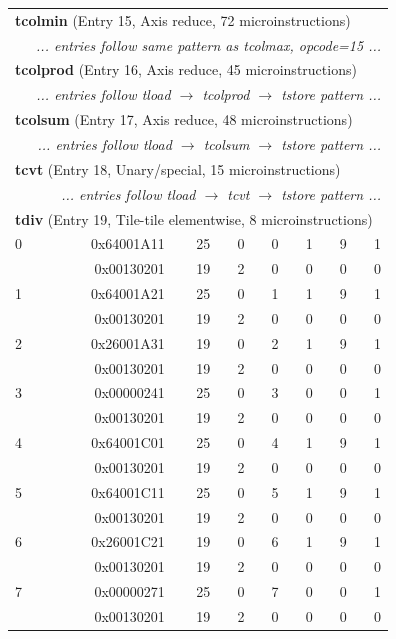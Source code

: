 \begin{longtable}{r r r r r r r r}
\multicolumn{8}{l}{\textbf{tcolmin} (Entry 15, Axis reduce, 72 microinstructions)} \\
  & \multicolumn{7}{r}{\textit{... entries follow same pattern as tcolmax, opcode=15 ...}} \\

\multicolumn{8}{l}{\textbf{tcolprod} (Entry 16, Axis reduce, 45 microinstructions)} \\
  & \multicolumn{7}{r}{\textit{... entries follow tload $\rightarrow$ tcolprod $\rightarrow$ tstore pattern ...}} \\

\multicolumn{8}{l}{\textbf{tcolsum} (Entry 17, Axis reduce, 48 microinstructions)} \\
  & \multicolumn{7}{r}{\textit{... entries follow tload $\rightarrow$ tcolsum $\rightarrow$ tstore pattern ...}} \\

\multicolumn{8}{l}{\textbf{tcvt} (Entry 18, Unary/special, 15 microinstructions)} \\
  & \multicolumn{7}{r}{\textit{... entries follow tload $\rightarrow$ tcvt $\rightarrow$ tstore pattern ...}} \\

\multicolumn{8}{l}{\textbf{tdiv} (Entry 19, Tile-tile elementwise, 8 microinstructions)} \\
0 & 0x64001A11 & 25 & 0 & 0 & 1 & 9 & 1 \\
  & 0x00130201 & 19 & 2 & 0 & 0 & 0 & 0 \\
1 & 0x64001A21 & 25 & 0 & 1 & 1 & 9 & 1 \\
  & 0x00130201 & 19 & 2 & 0 & 0 & 0 & 0 \\
2 & 0x26001A31 & 19 & 0 & 2 & 1 & 9 & 1 \\
  & 0x00130201 & 19 & 2 & 0 & 0 & 0 & 0 \\
3 & 0x00000241 & 25 & 0 & 3 & 0 & 0 & 1 \\
  & 0x00130201 & 19 & 2 & 0 & 0 & 0 & 0 \\
4 & 0x64001C01 & 25 & 0 & 4 & 1 & 9 & 1 \\
  & 0x00130201 & 19 & 2 & 0 & 0 & 0 & 0 \\
5 & 0x64001C11 & 25 & 0 & 5 & 1 & 9 & 1 \\
  & 0x00130201 & 19 & 2 & 0 & 0 & 0 & 0 \\
6 & 0x26001C21 & 19 & 0 & 6 & 1 & 9 & 1 \\
  & 0x00130201 & 19 & 2 & 0 & 0 & 0 & 0 \\
7 & 0x00000271 & 25 & 0 & 7 & 0 & 0 & 1 \\
  & 0x00130201 & 19 & 2 & 0 & 0 & 0 & 0 \\


\end{longtable}
